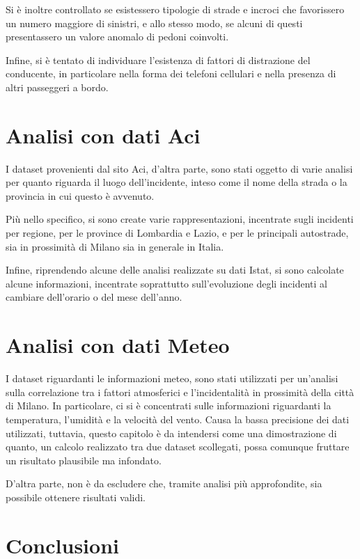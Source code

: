 \documentclass[a4paper]{article}
\begin{document}
Si è inoltre controllato se esistessero tipologie di strade e incroci che favorissero 
un numero maggiore di sinistri, e allo stesso modo, se alcuni di questi presentassero 
un valore anomalo di pedoni coinvolti.

Infine, si è tentato di individuare l'esistenza di fattori di distrazione del 
conducente, in particolare nella forma dei telefoni cellulari e nella presenza 
di altri passeggeri a bordo. 

\section{Analisi con dati Aci}

I dataset provenienti dal sito Aci, d'altra parte, sono stati oggetto di varie analisi per 
quanto riguarda il luogo dell'incidente, inteso come il nome della strada o la provincia 
in cui questo è avvenuto. 

Più nello specifico, si sono create varie rappresentazioni, incentrate sugli incidenti 
per regione, per le province di Lombardia e Lazio, e per le principali autostrade, sia in 
prossimità di Milano sia in generale in Italia.

Infine, riprendendo alcune delle analisi realizzate su dati Istat, si sono calcolate alcune 
informazioni, incentrate soprattutto sull'evoluzione degli incidenti al cambiare dell'orario 
o del mese dell'anno.

\section{Analisi con dati Meteo}

I dataset riguardanti le informazioni meteo, sono stati utilizzati per un'analisi sulla 
correlazione tra i fattori atmosferici e l'incidentalità in 
prossimità della città di Milano. 
In particolare, ci si è concentrati sulle informazioni riguardanti la temperatura, 
l'umidità e la velocità del vento. 
Causa la bassa precisione dei dati utilizzati, tuttavia, questo capitolo è 
da intendersi come una dimostrazione di quanto, un calcolo realizzato tra due dataset 
scollegati, possa comunque fruttare un risultato plausibile ma infondato. 

D'altra parte, non è da escludere che, tramite analisi più approfondite, 
sia possibile ottenere risultati validi.

\section{Conclusioni}

\printbibliography
\end{document}
